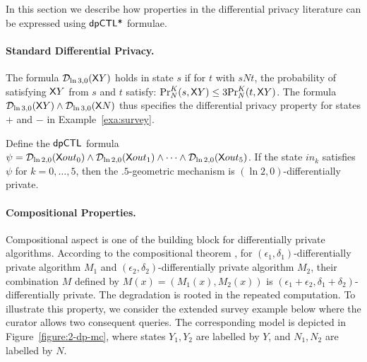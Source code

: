 In this section we describe how properties in the differential privacy literature can be expressed using $\dpCTLstar$ formulae.

\paragraph{Standard Differential Privacy.}
The formula $\dpriv{\ln 3}{0} (\X Y)$ holds in state $s$ if for  $t$ with $sNt$, the probability of satisfying $\X Y$ from $s$ and $t$ satisfy:
$\myPr{s}{K}{N}{\X Y}\le 3\myPr{t}{K}{N}{\X Y}$. The formula $\dpriv{\ln 3}{0} (\X Y)\wedge \dpriv{\ln 3}{0} (\X N)$ thus specifies the differential privacy property for states $+$ and $-$ in Example~\ref{exa:survey}.

 Define the $\dpCTL$ formula
$\psi = \dpriv{\ln 2}{0} (\X out_0) \wedge \dpriv{\ln 2}{0} (\X out_1) \wedge
\cdots \wedge \dpriv{\ln 2}{0} (\X out_5)$. If the state $in_k$ satisfies
$\psi$ for $k = 0, \ldots, 5$, then the $.5$-geometric mechanism is
$(\ln 2, 0)$-differentially private.


\paragraph{Compositional Properties.}
Compositional aspect is one of the building block for differentially private algorithms. According to the compositional theorem \cite[Theorem 3.16]{DR:14:AFDP}, for $(\epsilon_1,\delta_1)$-differentially private algorithm $M_1$ and
$(\epsilon_2,\delta_2)$-differentially private algorithm $M_2$, their combination $M$ defined by $M(x)=(M_1(x), M_2(x))$ is $(\epsilon_1 + \epsilon_2,\delta_1+\delta_2)$-differentially private. The degradation is rooted in the repeated computation. To illustrate this property, we consider the extended survey example below where the curator allows two consequent queries.
The corresponding model is depicted in Figure~\ref{figure:2-dp-mc}, where states $Y_1,Y_2$ are labelled by $Y$, and $N_1,N_2$ are labelled by $N$.

